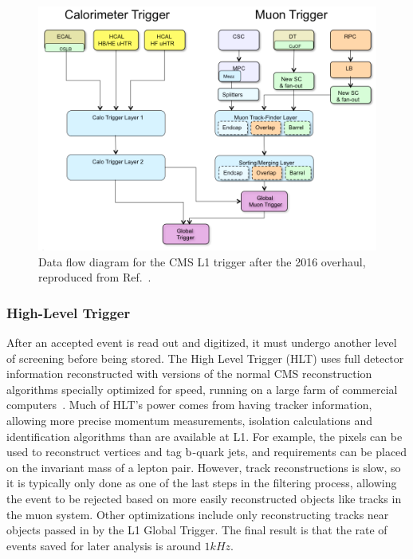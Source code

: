 \begin{figure}[htbp]
  \centering
  \includegraphics[width=\textwidth]{experiment/triggerFlow.png}
  \caption[Trigger data flow]{
    Data flow diagram for the CMS L1 trigger after the 2016 overhaul, reproduced from Ref.~\cite{Tapper:1556311}.
  }\label{fig:triggerFlow}
\end{figure}


\subsubsection{High-Level Trigger}
After an accepted event is read out and digitized, it must undergo another level of screening before being stored.
The High Level Trigger (HLT) uses full detector information reconstructed with versions of the normal CMS reconstruction algorithms specially optimized for speed, running on a large farm of commercial computers~\cite{Adam:2005zf}.
Much of HLT's power comes from having tracker information, allowing more precise momentum measurements, isolation calculations and identification algorithms than are available at L1.
For example, the pixels can be used to reconstruct vertices and tag $\mathrm{b}$-quark jets, and requirements can be placed on the invariant mass of a lepton pair.
However, track reconstructions is slow, so it is typically only done as one of the last steps in the filtering process, allowing the event to be rejected based on more easily reconstructed objects like tracks in the muon system.
Other optimizations include only reconstructing tracks near objects passed in by the L1 Global Trigger.
The final result is that the rate of events saved for later analysis is around $1\unit{kHz}$.


